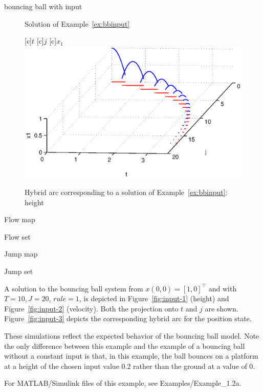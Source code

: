 \begin{example}{bouncing ball with input}
\begin{figure}[ht]
\begin{center}
\qquad
{}
\end{center}
\caption{Solution of Example~\ref{ex:bbinput}}
\end{figure}

\begin{figure}[ht]
  \begin{center}
  [c]{$t$}
  [c]{$j$}
  [c]{$x_1$}
    {\includegraphics[width=.8\textwidth]{figures/Examples/HybridArc1.eps}}
   \caption{Hybrid arc corresponding to a solution of Example~\ref{ex:bbinput}: height}
  \end{center}
\end{figure}

Flow map
\label{scr:f}

Flow set
\label{scr:C}

Jump map
\label{scr:g}

Jump set
\label{scr:D}

A solution to the bouncing ball system from $x(0,0)=[1,0]^\top$ and with $T=10, J=20$, $rule =1$, is
depicted in Figure~\ref{fig:input-1} (height) and Figure~\ref{fig:input-2} (velocity).  Both the projection
onto $t$ and $j$ are shown. Figure~\ref{fig:input-3} depicts the corresponding hybrid arc for the position state.

These simulations reflect the expected behavior of the bouncing ball model. Note the only
difference between this example and the example of a bouncing ball without a constant input is that, in this example, the ball bounces on a platform at a height of the chosen input value $0.2$ rather than the ground at a value of $0$.

For MATLAB/Simulink files of this example, see Examples/Example\_1.2a.

\end{example}
